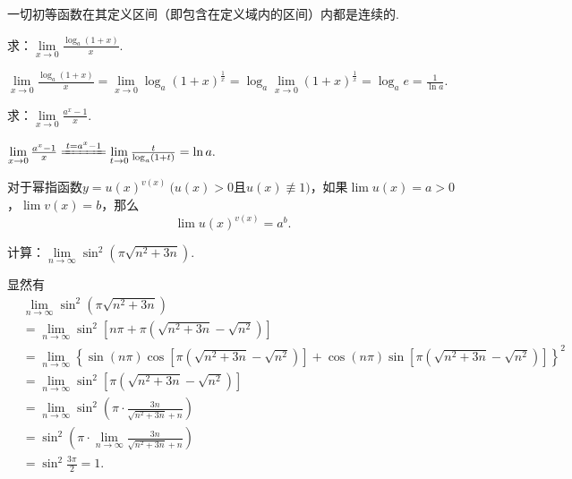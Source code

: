 \begin{corollary}\label{theorem:极限.连续函数的极限6}
一切初等函数在其定义区间（即包含在定义域内的区间）内都是连续的.
\end{corollary}

\begin{example}
求：\(\lim\limits_{x\to0}\frac{\log_a (1+x)}{x}\).
\begin{solution}
\(
\lim\limits_{x\to0}\frac{\log_a (1+x)}{x}
= \lim\limits_{x\to0}\log_a (1+x)^{\frac{1}{x}}
= \log_a \lim\limits_{x\to0}(1+x)^{\frac{1}{x}}
= \log_a e
= \frac{1}{\ln a}.
\)
\end{solution}
\end{example}

\begin{example}
求：\(\lim\limits_{x\to0}\frac{a^x - 1}{x}\).
\begin{solution}
\(
\lim\limits_{x\to0}\frac{a^x - 1}{x}
\xlongequal{t=a^x-1} \lim\limits_{t\to0}\frac{t}{\log_a (1+t)}
= \ln a.
\)
\end{solution}
\end{example}

\begin{theorem}\label{theorem:极限.连续函数的极限7}
对于幂指函数\(y = u(x)^{v(x)}\ (u(x) > 0\)且\(u(x) \not\equiv 1)\)，如果\(\lim u(x) = a > 0\)，\(\lim v(x) = b\)，那么\[
\lim u(x)^{v(x)} = a^b.
\]
\end{theorem}

\begin{example}
\def\l{\lim\limits_{n\to\infty}}
计算：\(\l \sin^2(\pi\sqrt{n^2+3n})\).
\begin{solution}
\def\a{\pi(\sqrt{n^2+3n}-\sqrt{n^2})}
显然有\begin{align*}
&\l \sin^2(\pi\sqrt{n^2+3n}) \\
&= \l \sin^2[n\pi+\a] \\
&= \l \left\{ \sin(n\pi) \cos\left[\a\right] + \cos(n\pi) \sin\left[\a\right] \right\}^2 \\
&= \l \sin^2\left[\a\right] \\
&= \l \sin^2\left( \pi \cdot \frac{3n}{\sqrt{n^2+3n}+n} \right) \\
&= \sin^2 \left( \pi \cdot \l \frac{3n}{\sqrt{n^2+3n}+n} \right) \\
&= \sin^2 \frac{3\pi}{2}
= 1.
\end{align*}
\end{solution}
\end{example}


